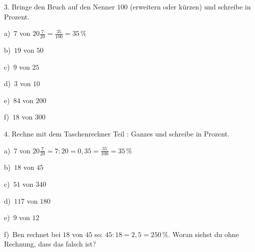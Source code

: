 \documentclass[11pt]{article}
\newcommand{\grau}[1]{{\color{mbgrau}#1}}
\begin{document}
\begin{pfaufg}{}{3.}{}
Bringe den Bruch auf den Nenner $100$ (erweitern oder kürzen) und schreibe in Prozent.\par\medskip
\grau{a)\ $7$ von $20$\quad $\frac{7}{20} = \frac{35}{100} = 35\,\%$}\par\medskip
\noindent\begin{minipage}[t]{0.48\linewidth}
b)\ $19$ von $50$
\end{minipage}\hfill
\begin{minipage}[t]{0.48\linewidth}
c)\ $9$ von $25$
\end{minipage}
\noindent\begin{minipage}[t]{0.48\linewidth}
d)\ $3$ von $10$
\end{minipage}\hfill
\begin{minipage}[t]{0.48\linewidth}
e)\ $84$ von $200$
\end{minipage}
\noindent\begin{minipage}[t]{0.48\linewidth}
f)\ $18$ von $300$
\end{minipage}
\end{pfaufg}

\begin{pfaufg}{}{4.}{}
Rechne mit dem Taschenrechner Teil : Ganzes und schreibe in Prozent.\par\medskip
\grau{a)\ $7$ von $20$\quad $\frac{7}{20} = 7 : 20 = 0{,}35 = \frac{35}{100} = 35\,\%$}\par\medskip
\noindent\begin{minipage}[t]{0.48\linewidth}
b)\ $18$ von $45$
\end{minipage}\hfill
\begin{minipage}[t]{0.48\linewidth}
c)\ $51$ von $340$
\end{minipage}
\noindent\begin{minipage}[t]{0.48\linewidth}
d)\ $117$ von $180$
\end{minipage}\hfill
\begin{minipage}[t]{0.48\linewidth}
e)\ $9$ von $12$
\end{minipage}
\noindent\begin{minipage}[t]{0.48\linewidth}
f)\ Ben rechnet bei $18$ von $45$ so: $45 : 18 = 2{,}5 = 250\,\%$. Woran siehst du ohne Rechnung, dass das falsch ist?
\end{minipage}
\end{pfaufg}
\end{document}
